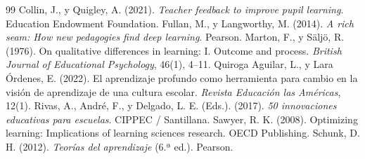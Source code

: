 \documentclass[spanish,letterpaper,oneside]{article}
\begin{document}
\clearpage
\begin{thebibliography}{99}
 Collin, J., y Quigley, A. (2021). \textit{Teacher feedback to improve pupil learning}. Education Endowment Foundation.
 Fullan, M., y Langworthy, M. (2014). \textit{A rich seam: How new pedagogies find deep learning}. Pearson.
 Marton, F., y Säljö, R. (1976). On qualitative differences in learning: I. Outcome and process. \textit{British Journal of Educational Psychology}, 46(1), 4--11.
 Quiroga Aguilar, L., y Lara Órdenes, E. (2022). El aprendizaje profundo como herramienta para cambio en la visión de aprendizaje de una cultura escolar. \textit{Revista Educación las Américas}, 12(1).
 Rivas, A., André, F., y Delgado, L. E. (Eds.). (2017). \textit{50 innovaciones educativas para escuelas}. CIPPEC / Santillana.
 Sawyer, R. K. (2008). Optimizing learning: Implications of learning sciences research. OECD Publishing.
 Schunk, D. H. (2012). \textit{Teorías del aprendizaje} (6.ª ed.). Pearson.
\end{thebibliography}
\end{document}
